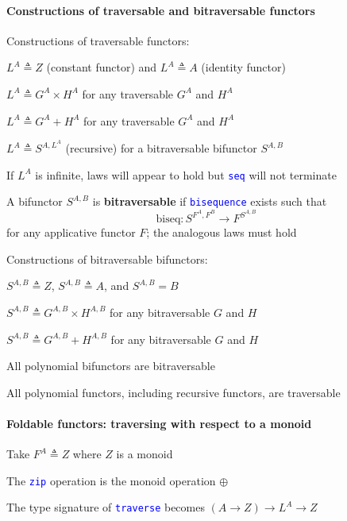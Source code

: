 \paragraph{Constructions of traversable and bitraversable functors}

Constructions of traversable functors:

$L^{A}\triangleq Z$ (constant functor) and $L^{A}\triangleq A$ (identity
functor)

$L^{A}\triangleq G^{A}\times H^{A}$ for any traversable $G^{A}$
and $H^{A}$

$L^{A}\triangleq G^{A}+H^{A}$ for any traversable $G^{A}$ and $H^{A}$

$L^{A}\triangleq S^{A,L^{A}}$ (recursive) for a bitraversable bifunctor
$S^{A,B}$ 

If $L^{A}$ is infinite, laws will appear to hold but \texttt{\textcolor{blue}{\footnotesize{}seq}}
will not terminate

A bifunctor $S^{A,B}$ is \textbf{bitraversable} if \texttt{\textcolor{blue}{\footnotesize{}bisequence}}
exists such that
\[
\text{biseq}:S^{F^{A},F^{B}}\rightarrow F^{S^{A,B}}
\]
 for any applicative functor $F$; the analogous laws must hold

Constructions of bitraversable bifunctors:

$S^{A,B}\triangleq Z$, $S^{A,B}\triangleq A$, and $S^{A,B}=B$

$S^{A,B}\triangleq G^{A,B}\times H^{A,B}$ for any bitraversable $G$
and $H$

$S^{A,B}\triangleq G^{A,B}+H^{A,B}$ for any bitraversable $G$ and
$H$

All polynomial bifunctors are bitraversable

All polynomial functors, including recursive functors, are traversable


\paragraph{Foldable functors: traversing with respect to a monoid}

\vspace{-0.15cm}Take $F^{A}\triangleq Z$ where $Z$ is a monoid

The \texttt{\textcolor{blue}{\footnotesize{}zip}} operation is the
monoid operation $\oplus$

The type signature of \texttt{\textcolor{blue}{\footnotesize{}traverse}}
becomes $\left(A\rightarrow Z\right)\rightarrow L^{A}\rightarrow Z$

